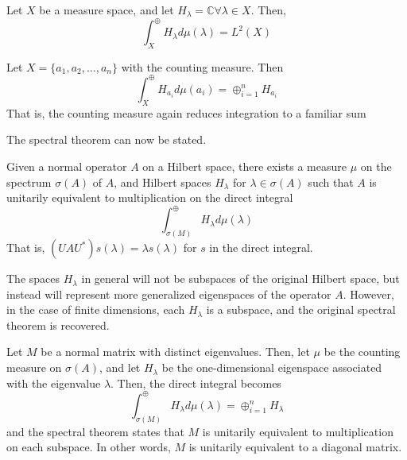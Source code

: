 \begin{example}
    Let $X$ be a measure space, and let $H_{\lambda} = \mathbb{C} \forall
    \lambda\in X$. Then,
    \[
        \int_X^{\oplus}H_\lambda d\mu(\lambda) = L^2(X)
    \]
\end{example}

\begin{example}
    Let $X = \{a_1, a_2, \hdots, a_n\}$ with the counting measure. Then
    \[
        \int_X^{\oplus}H_{a_i} d\mu(a_i) = \oplus_{i=1}^n H_{a_i}
        \]
    That is, the counting measure again reduces integration to a familiar sum
\end{example}

The spectral theorem can now be stated.

\begin{theorem}
    Given a normal operator $A$ on a Hilbert space, there exists a measure $\mu$
    on the spectrum $\sigma(A)$ of $A$, and Hilbert spaces $H_{\lambda}$ for
    $\lambda\in\sigma(A)$ such that $A$ is unitarily equivalent to
    multiplication on the direct integral
    \[
        \int_{\sigma(M)}^{\oplus}H_\lambda d\mu(\lambda)
    \]
    That is, $(UAU^*)s(\lambda) = \lambda s(\lambda)$ for $s$ in the direct
    integral.
\end{theorem}

The spaces $H_{\lambda}$ in general will not be subspaces of the original
Hilbert space, but instead will represent more generalized eigenspaces of the
operator $A$. However, in the case of finite dimensions, each $H_{\lambda}$ is a
subspace, and the original spectral theorem is recovered.

\begin{example}
    Let $M$ be a normal matrix with distinct eigenvalues. Then, let $\mu$ be the
    counting measure on $\sigma(A)$, and let $H_{\lambda}$ be the
    one-dimensional eigenspace associated with the eigenvalue $\lambda$. Then,
    the direct integral becomes
    \[
        \int_{\sigma(M)}^{\oplus}H_\lambda d\mu(\lambda) = \oplus_{i=1}^n
        H_{\lambda}
        \]
    and the spectral theorem states that $M$ is unitarily equivalent to
    multiplication on each subspace. In other words, $M$ is unitarily equivalent
    to a diagonal matrix.
\end{example}
